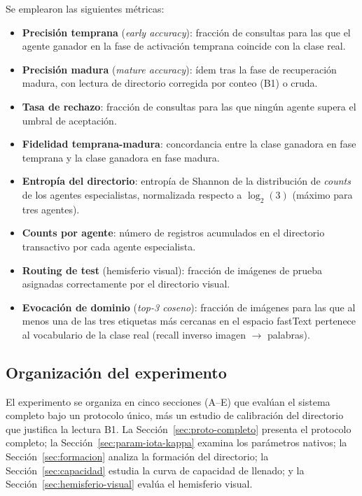 Se emplearon las siguientes métricas:

\begin{itemize}
    \item \textbf{Precisión temprana} (\textit{early accuracy}): fracción de consultas para las que el agente ganador en la fase de activación temprana coincide con la clase real.
    \item \textbf{Precisión madura} (\textit{mature accuracy}): ídem tras la fase de recuperación madura, con lectura de directorio corregida por conteo (B1) o cruda.
    \item \textbf{Tasa de rechazo}: fracción de consultas para las que ningún agente supera el umbral de aceptación.
    \item \textbf{Fidelidad temprana-madura}: concordancia entre la clase ganadora en fase temprana y la clase ganadora en fase madura.
    \item \textbf{Entropía del directorio}: entropía de Shannon de la distribución de \textit{counts} de los agentes especialistas, normalizada respecto a $\log_2(3)$ (máximo para tres agentes).
    \item \textbf{Counts por agente}: número de registros acumulados en el directorio transactivo por cada agente especialista.
    \item \textbf{Routing de test} (hemisferio visual): fracción de imágenes de prueba asignadas correctamente por el directorio visual.
    \item \textbf{Evocación de dominio} (\textit{top-3 coseno}): fracción de imágenes para las que al menos una de las tres etiquetas más cercanas en el espacio fastText pertenece al vocabulario de la clase real (recall inverso imagen $\to$ palabras).
\end{itemize}

\subsection{Organización del experimento}
\label{sec:organizacion}

El experimento se organiza en cinco secciones (A--E) que evalúan el sistema completo bajo un protocolo único, más un estudio de calibración del directorio que justifica la lectura B1.
La Sección~\ref{sec:proto-completo} presenta el protocolo completo; la Sección~\ref{sec:param-iota-kappa} examina los parámetros nativos; la Sección~\ref{sec:formacion} analiza la formación del directorio; la Sección~\ref{sec:capacidad} estudia la curva de capacidad de llenado; y la Sección~\ref{sec:hemisferio-visual} evalúa el hemisferio visual.

